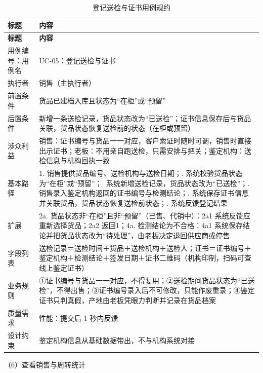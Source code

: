 {\small
\begin{longtable}{@{}L{3.0cm} L{12.3cm}@{}}
\caption{登记送检与证书用例规约}\label{tab:uc-05}\\
\toprule
\textbf{标题} & \textbf{内容} \\
\midrule
\endfirsthead
\toprule
\textbf{标题} & \textbf{内容} \\
\midrule
\endhead
用例编号：用例名 & UC-05：登记送检与证书 \\
\midrule
执行者 & 销售（主执行者） \\
\midrule
前置条件 & 货品已建档入库且状态为“在柜”或“预留” \\
\midrule
后置条件 & 新增一条送检记录，货品状态改为“已送检”；证书信息保存后与货品关联，货品状态恢复送检前的状态（在柜或预留） \\
\midrule
涉众利益 & 销售：证书编号与货品一一对应，客户索证时随时可调，销售时直接出示证书；\newline 老板：不用亲自跑送检，只需安排与把关；\newline 鉴定机构：送检信息与机构回执一致 \\
\midrule
基本路径 & 1. 销售提供货品编号、送检机构与送检日期；. 系统校验货品状态为“在柜”或“预留”；. 系统新增送检记录，货品状态改为“已送检”；. 销售录入鉴定机构返回的证书编号与检测结论；. 系统保存证书信息并关联货品，货品状态恢复送检前状态；. 系统反馈登记结果 \\
\midrule
扩展 & 2a. 货品状态非“在柜”且非“预留”（已售、代销中）：2a1 系统反馈应重新选择货品；2a2 返回1；\newline 4a. 检测结论为不合格：4a1 系统保存结论并把货品状态改为“待处理”，由老板决定退回供应商或停售 \\
\midrule
字段列表 & 送检记录＝送检时间＋货品＋送检机构＋送检人；\newline 证书＝证书编号＋鉴定机构＋检测结论＋签发日期＋证书二维码（机构印制，扫码可查线上鉴定证书） \\
\midrule
业务规则 & ①证书编号与货品一一对应，不得复用；\newline ②送检期间货品状态为“已送检”，不得出售；\newline ③证书编号录入后不可修改，只能作废重录；\newline ④鉴定证书只判真假，产地由老板凭眼力判断并记录在货品档案 \\
\midrule
质量需求 & 性能：提交后 1 秒内反馈 \\
\midrule
设计约束 & 鉴定机构信息从基础数据带出，不与机构系统对接 \\
\midrule
\bottomrule
\end{longtable}}
\noindent（6）查看销售与周转统计

